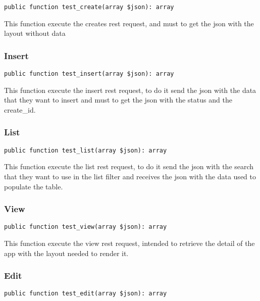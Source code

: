 \documentclass[a4paper]{article}
\begin{document}
\begin{lstlisting}
public function test_create(array $json): array
\end{lstlisting}

This function execute the creates rest request, and must to get the
json with the layout without data

\hypertarget{toc444}{}
\subsubsection{Insert}

\begin{lstlisting}
public function test_insert(array $json): array
\end{lstlisting}

This function execute the insert rest request, to do it send the json with
the data that they want to insert and must to get the json with the status
and the create\_id.

\hypertarget{toc445}{}
\subsubsection{List}

\begin{lstlisting}
public function test_list(array $json): array
\end{lstlisting}

This function execute the list rest request, to do it send the json with
the search that they want to use in the list filter and receives the json
with the data used to populate the table.

\hypertarget{toc446}{}
\subsubsection{View}

\begin{lstlisting}
public function test_view(array $json): array
\end{lstlisting}

This function execute the view rest request, intended to retrieve the detail
of the app with the layout needed to render it.

\hypertarget{toc447}{}
\subsubsection{Edit}

\begin{lstlisting}
public function test_edit(array $json): array
\end{lstlisting}
\end{document}
